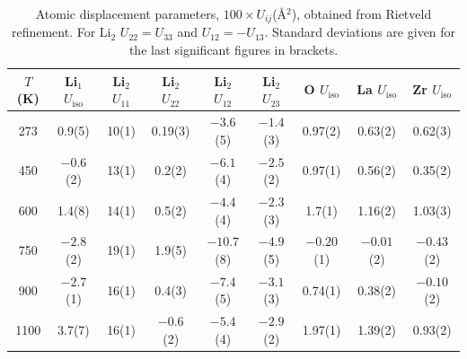 \documentclass[twoside,twocolumn,9pt]{article}
\begin{document}
\begin{table}[t]
\centering
\caption{Atomic displacement parameters, $100 \times U_{ij}$(\AA$^2$), obtained from Rietveld refinement. For Li$_2$ $U_{22} = U_{33}$ and $U_{12} = - U_{13}$. Standard deviations are given for the last significant figures in brackets. }
\label{tab:Li_displacement_parameters}
\begin{tabular}{ccccccccc}
\hline
\hline
$T$ (K) & Li$_1$ $U_\mathrm{iso}$  & Li$_2$ $U_{11}$ & Li$_2$ $U_{22}$ & Li$_2$ $U_{12}$ & Li$_2$ $U_{23}$  & O $U_\mathrm{iso}$  & La $U_\mathrm{iso}$  & Zr $U_\mathrm{iso}$\\
\hline
273     &  0.9(5)        & 10(1)     &  0.19(3)        & $-3.6$(5)      & $-1.4$(3)     &  0.97(2)        &  0.63(2)         &  0.62(3)        \\
450     & $-0.6$(2)    & 13(1)     &  0.2(2)          & $-6.1$(4)      & $-2.5$(2)     &  0.97(1)        &  0.56(2)         &  0.35(2)        \\
600     &  1.4(8)        & 14(1)     &  0.5(2)          & $-4.4$(4)      & $-2.3$(3)     &  1.7(1)          &  1.16(2)         &  1.03(3)        \\
750     & $-2.8$(2)    & 19(1)     &  1.9(5)          & $-10.7$(8)    & $-4.9$(5)     & $-0.20$(1)    & $-0.01$(2)     & $-0.43$(2)   \\
900     & $-2.7$(1)    & 16(1)     &  0.4(3)          & $-7.4$(5)      & $-3.1$(3)     &  0.74(1)        &  0.38(2)         & $-0.10$(2)    \\
1100   &  3.7(7)        & 16(1)     & $-0.6$(2)      & $-5.4$(4)      & $-2.9$(2)     &  1.97(1)        &  1.39(2)         &  0.93(2)        \\
\hline
\hline
\end{tabular}
\end{table}
\end{document}
